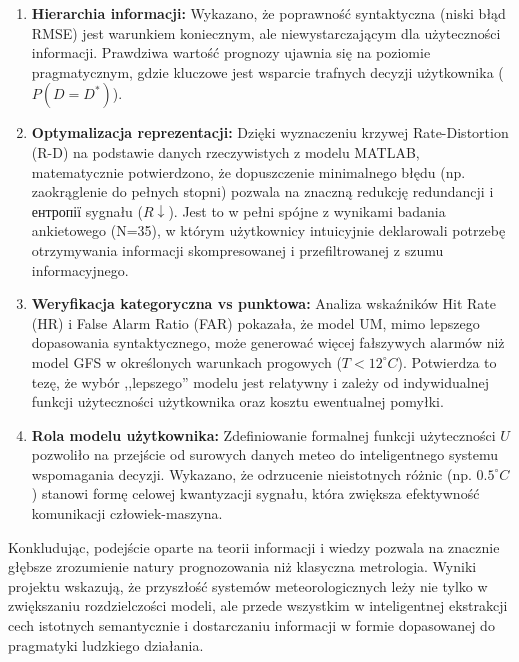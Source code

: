 \documentclass[a4paper,12pt]{article}
\begin{document}
\begin{enumerate}
    \item \textbf{Hierarchia informacji:} Wykazano, że poprawność syntaktyczna (niski błąd RMSE) jest warunkiem koniecznym, ale niewystarczającym dla użyteczności informacji. Prawdziwa wartość prognozy ujawnia się na poziomie pragmatycznym, gdzie kluczowe jest wsparcie trafnych decyzji użytkownika ($P(D=D^*)$).
    
    \item \textbf{Optymalizacja reprezentacji:} Dzięki wyznaczeniu krzywej Rate-Distortion (R-D) na podstawie danych rzeczywistych z modelu MATLAB, matematycznie potwierdzono, że dopuszczenie minimalnego błędu (np. zaokrąglenie do pełnych stopni) pozwala na znaczną redukcję redundancji i ентропії sygnału ($R \downarrow$). Jest to w pełni spójne z wynikami badania ankietowego (N=35), w którym użytkownicy intuicyjnie deklarowali potrzebę otrzymywania informacji skompresowanej i przefiltrowanej z szumu informacyjnego.
    \item \textbf{Weryfikacja kategoryczna vs punktowa:} Analiza wskaźników Hit Rate (HR) i False Alarm Ratio (FAR) pokazała, że model UM, mimo lepszego dopasowania syntaktycznego, może generować więcej fałszywych alarmów niż model GFS w określonych warunkach progowych ($T < 12^\circ C$). Potwierdza to tezę, że wybór ,,lepszego'' modelu jest relatywny i zależy od indywidualnej funkcji użyteczności użytkownika oraz kosztu ewentualnej pomyłki.
    
    \item \textbf{Rola modelu użytkownika:} Zdefiniowanie formalnej funkcji użyteczności $U$ pozwoliło na przejście od surowych danych meteo do inteligentnego systemu wspomagania decyzji. Wykazano, że odrzucenie nieistotnych różnic (np. $0.5^\circ C$) stanowi formę celowej kwantyzacji sygnału, która zwiększa efektywność komunikacji człowiek-maszyna.
\end{enumerate}

Konkludując, podejście oparte na teorii informacji i wiedzy pozwala na znacznie głębsze zrozumienie natury prognozowania niż klasyczna metrologia. Wyniki projektu wskazują, że przyszłość systemów meteorologicznych leży nie tylko w zwiększaniu rozdzielczości modeli, ale przede wszystkim w inteligentnej ekstrakcji cech istotnych semantycznie i dostarczaniu informacji w formie dopasowanej do pragmatyki ludzkiego działania.
\end{document}
